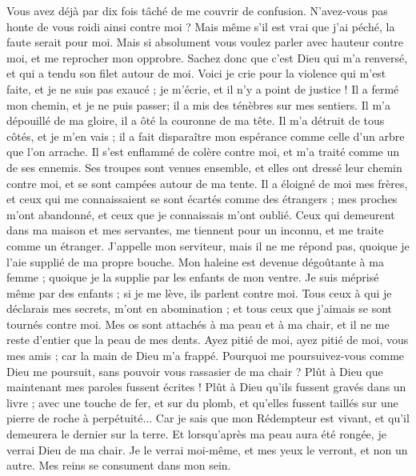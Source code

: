 \begin{multicols}{2}
{Vous avez déjà par dix fois tâché de me couvrir de confusion. N'avez-vous pas honte de vous roidi ainsi contre moi ? 
Mais même s'il est vrai que j'ai péché, la faute serait pour moi. 
Mais si absolument vous voulez parler avec hauteur contre moi, et me reprocher mon opprobre. 
Sachez donc que c'est Dieu qui m'a renversé, et qui a tendu son filet autour de moi. 
Voici je crie pour la violence qui m'est faite, et je ne suis pas exaucé ; je m'écrie, et il n'y a point de justice !
Il a fermé mon chemin, et je ne puis passer; il a mis des ténèbres sur mes sentiers. 
Il m'a dépouillé de ma gloire, il a ôté la couronne de ma tête.
Il m'a détruit de tous côtés, et je m'en vais ; il a fait disparaître mon espérance comme celle d'un arbre que l'on arrache. 
Il s'est enflammé de colère contre moi, et m'a traité comme un de ses ennemis.
Ses troupes sont venues ensemble, et elles ont dressé leur chemin contre moi, et se sont campées autour de ma tente.
Il a éloigné de moi mes frères, et ceux qui me connaissaient se sont écartés comme des étrangers ;
mes proches m'ont abandonné, et ceux que je connaissais m'ont oublié.
Ceux qui demeurent dans ma maison et mes servantes, me tiennent pour un inconnu, et me traite comme un étranger. 
J'appelle mon serviteur, mais il ne me répond pas, quoique je l'aie supplié de ma propre bouche.
Mon haleine est devenue dégoûtante à ma femme ; quoique je la supplie par les enfants de mon ventre.
Je suis méprisé même par des enfants ; si je me lève, ils parlent contre moi.
Tous ceux à qui je déclarais mes secrets, m'ont en abomination ; et tous ceux que j'aimais se sont tournés contre moi.
Mes os sont attachés à ma peau et à ma chair, et il ne me reste d'entier que la peau de mes dents.
Ayez pitié de moi, ayez pitié de moi, vous mes amis ; car la main de Dieu m'a frappé.
Pourquoi me poursuivez-vous comme Dieu me poursuit, sans pouvoir vous rassasier de ma chair ? 
Plût à Dieu que maintenant mes paroles fussent écrites ! Plût à Dieu qu'ils fussent gravés dans un livre ; 
avec une touche de fer, et sur du plomb, et qu'elles fussent taillés sur une pierre de roche à perpétuité...
Car je sais que mon Rédempteur est vivant, et qu'il demeurera le dernier sur la terre.
Et lorsqu'après ma peau aura été rongée, je verrai Dieu de ma chair.
Je le verrai moi-même, et mes yeux le verront, et non un autre. Mes reins se consument dans mon sein. 
}
\end{multicols}
